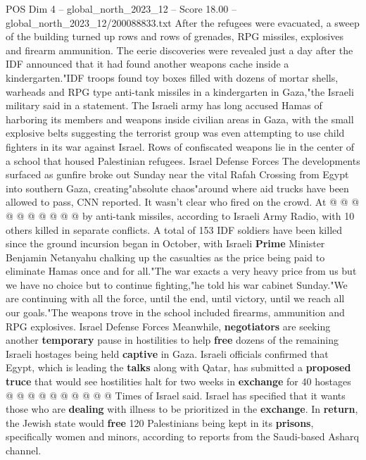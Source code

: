 \begin{textsample}{POS Dim 4 – global\_north\_2023\_12 – Score 18.00 – global\_north\_2023\_12/200088833.txt}  \label{ex:f4_pos_310}
After the refugees were evacuated, a sweep of the building turned up rows and rows of grenades, RPG missiles, explosives and firearm ammunition.
The eerie discoveries were revealed just a day after the IDF announced that it had found another weapons cache inside a kindergarten."IDF troops found toy boxes filled with dozens of mortar shells, warheads and RPG type anti-tank missiles in a kindergarten in Gaza,"the Israeli military said in a statement.
The Israeli army has long accused Hamas of harboring its members and weapons inside civilian areas in Gaza, with the small explosive belts suggesting the terrorist group was even attempting to use child fighters in its war against Israel.
Rows of confiscated weapons lie in the center of a school that housed Palestinian refugees.
Israel Defense Forces The developments surfaced as gunfire broke out Sunday near the vital Rafah Crossing from Egypt into southern Gaza, creating"absolute chaos"around where aid trucks have been allowed to pass, CNN reported.
It wasn't clear who fired on the crowd.
At @ @ @ @ @ @ @ @ @ @ by anti-tank missiles, according to Israeli Army Radio, with 10 others killed in separate conflicts.
A total of 153 IDF soldiers have been killed since the ground incursion began in October, with Israeli \textbf{Prime} Minister Benjamin Netanyahu chalking up the casualties as the price being paid to eliminate Hamas once and for all."The war exacts a very heavy price from us but we have no choice but to continue fighting,"he told his war cabinet Sunday."We are continuing with all the force, until the end, until victory, until we reach all our goals."The weapons trove in the school included firearms, ammunition and RPG explosives.
Israel Defense Forces Meanwhile, \textbf{negotiators} are seeking another \textbf{temporary} pause in hostilities to help \textbf{free} dozens of the remaining Israeli hostages being held \textbf{captive} in Gaza.
Israeli officials confirmed that Egypt, which is leading the \textbf{talks} along with Qatar, has submitted a \textbf{proposed} \textbf{truce} that would see hostilities halt for two weeks in \textbf{exchange} for 40 hostages @ @ @ @ @ @ @ @ @ @ Times of Israel said.
Israel has specified that it wants those who are \textbf{dealing} with illness to be prioritized in the \textbf{exchange}.
In \textbf{return}, the Jewish state would \textbf{free} 120 Palestinians being kept in its \textbf{prisons}, specifically women and minors, according to reports from the Saudi-based Asharq channel.

\end{textsample}
